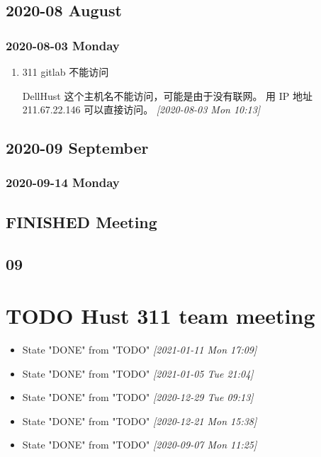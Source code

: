 \documentclass[11pt]{article}
\begin{document}
\subsection{2020-08 August}
\label{sec:org516a9b7}
\subsubsection{2020-08-03 Monday}
\label{sec:org48133e0}
\begin{enumerate}
\item 311 gitlab 不能访问
\label{sec:orge2c3c02}

DellHust 这个主机名不能访问，可能是由于没有联网。
用 IP 地址 211.67.22.146 可以直接访问。
\textit{[2020-08-03 Mon 10:13]}
\end{enumerate}

\subsection{2020-09 September}
\label{sec:org77298e3}
\subsubsection{2020-09-14 Monday}
\label{sec:org8278e92}
\subsection{{\bfseries\sffamily FINISHED} Meeting}
\label{sec:org06921ae}

\subsection{09}
\label{sec:orgafd31ae}

\section{{\bfseries\sffamily TODO} Hust 311 team meeting}
\label{sec:orgcbd8582}
\begin{itemize}
\item State "DONE"       from "TODO"       \textit{[2021-01-11 Mon 17:09]}
\item State "DONE"       from "TODO"       \textit{[2021-01-05 Tue 21:04]}
\item State "DONE"       from "TODO"       \textit{[2020-12-29 Tue 09:13]}
\item State "DONE"       from "TODO"       \textit{[2020-12-21 Mon 15:38]}
\item State "DONE"       from "TODO"       \textit{[2020-09-07 Mon 11:25]}
\end{itemize}
\end{document}
